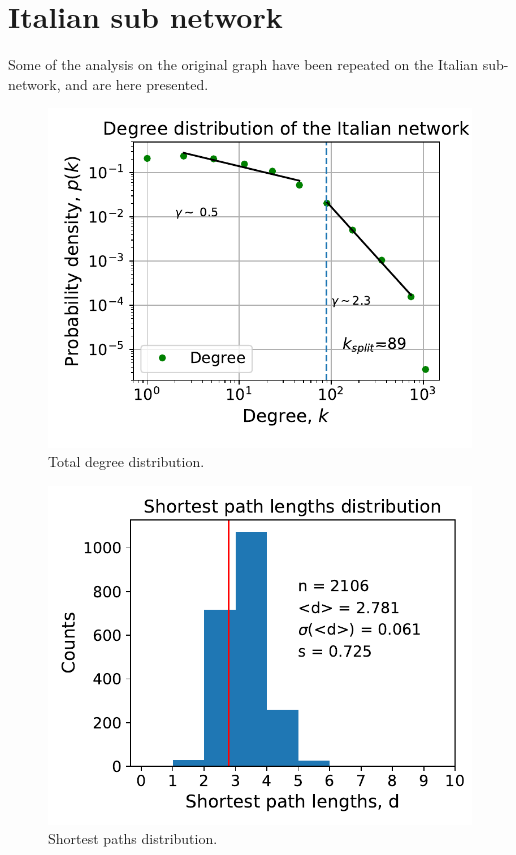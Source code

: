 \documentclass[11pt, twoside]{report}
\begin{document}
\section{Italian sub network}
Some of the analysis on the original graph have been repeated on the Italian sub-network, and are here presented.
\begin{minipage}[b]{0.5\textwidth}
   \centering
    \begin{figure}[H]
      \includegraphics[width=\textwidth]{../../scripts/network_analysis/imgs/tot_degree_distribution_ita.pdf}
          \caption{Total degree distribution.}
      \label{fig:tot_degree_ita}
\end{figure}
\end{minipage}
\begin{minipage}[b]{0.5\textwidth}
  \begin{figure}[H]
  \centering
      \includegraphics[width=\textwidth]{../../scripts/network_analysis/imgs/paths_hist_ita.pdf}
        \caption{Shortest paths distribution.}
\end{figure}
\end{minipage}
\end{document}
